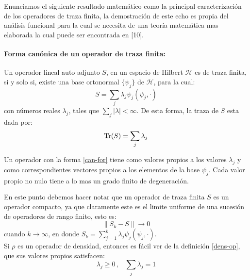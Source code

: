 \documentclass[12pt]{book}
\numberwithin{equation}{chapter}
\def\rar{\rightarrow}
\def\H{\mathcal{H}}
\def\Tr{\hbox{Tr}}
\begin{document}
Enunciamos el siguiente resultado matem\'atico como la principal caracterizaci\'on de los operadores de traza finita, la demostraci\'on de este echo es propia del an\'alisis funcional para la cual se necesita de una teor\'ia matem\'atica mas elaborada la cual puede ser encontrada en [10].

\paragraph{Forma can\'onica de un operador de traza finita:} 
Un operador lineal auto adjunto $S$, en un espacio de Hilbert $\H$ es de traza finita, si y solo si, existe una base ortonormal $\{ \psi_{j} \}$ de $\H$, para la cual:
\begin{equation}\label{can-for}
S  = \sum_{j} \lambda_{j} \psi_{j} ( \psi_{j}, \cdot ) 
\end{equation}
con n\'umeros reales $\lambda_{j}$, tales que $ \sum_{j}|\lambda| < \infty $. De esta forma, la traza de $S$ esta dada por:
\begin{equation}
\Tr (S) = \sum_{j} \lambda_{j}
\end{equation}

Un operador con la forma \eqref{can-for} tiene como valores propios a los valores $\lambda_{j}$ y como correspondientes vectores propios a los elementos de la base $\psi_{j}$. Cada valor propio no nulo tiene a lo mas un grado finito de degeneraci\'on.

\rightline{$\dag$}
\vspace{5 mm}

En este punto debemos hacer notar que un operador de traza finita $S$ es un operador compacto, ya que claramente este es el limite uniforme de una sucesi\'on de operadores de rango finito, esto es:
$$ \| S_{k} - S \| \rar 0 $$
cuando $k \rar \infty$, en donde $S_{k}=\sum_{j=1}^{k} \lambda_{j} \psi_{j} ( \psi_{j} , \cdot )$.\\

Si $\rho$ es un operador de densidad, entonces es f\'acil ver de la definici\'on \ref{dens-op}, que sus valores propios satisfacen:
\begin{equation}
\lambda_{j} \geq 0 \,,\,\,\,\,\, \sum_{j} \lambda_{j}=1
\end{equation}
\end{document}
